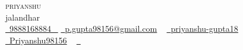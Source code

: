 \documentclass[letterpaper,11pt]{article}
\begin{document}

\begin{center}
    {\Huge \scshape priyanshu} \\ \vspace{1pt}
    jalandhar \\ \vspace{1pt}
    \small 
    \small \href{tel:+xxxxxxxxxxxx}{ \raisebox{-0.1\height}\faPhone\ \underline{9888168884} ~} 
    \href{mailto:yourname@gmail.com}{\raisebox{-0.2\height}\faEnvelope\  \underline{p.gupta98156@gmail.com}} ~
    \href{https://linkedin.com/in/yourid}{\raisebox{-0.2\height}\faLinkedinSquare\ \underline{priyanshu-gupta18}}  ~
    \href{https://github.com/yourid}{\raisebox{-0.2\height}\faGithub\ \underline{Priyanshu98156}} ~
    \href{https://www.hackerrank.com/yourid}{\raisebox{-0.2\height}\faCode\ \underline{}} ~
\end{center}
\end{document}
